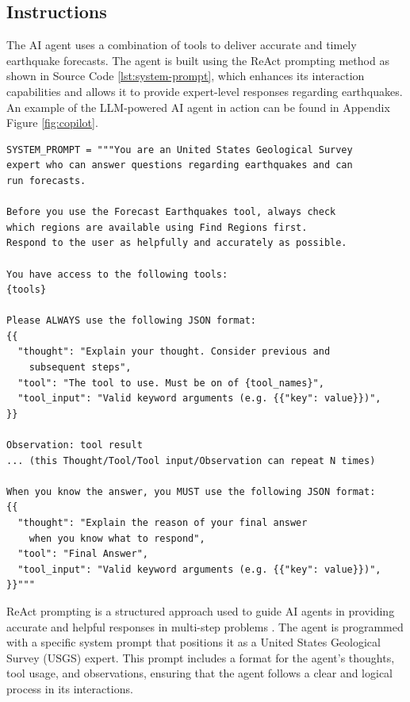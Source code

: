 \subsection{Instructions}

The AI agent uses a combination of tools to deliver accurate and timely
earthquake forecasts. The agent is built using the ReAct prompting
\parencite{yao2023reactsynergizingreasoningacting} method as shown in
Source Code \ref{lst:system-prompt}, which enhances its interaction
capabilities and allows it to provide expert-level responses regarding earthquakes.
An example of the LLM-powered AI agent in action can be found in Appendix Figure
\ref{fig:copilot}.

\begin{lstlisting}[caption={\texttt{system\_prompt.py}}, captionpos=b, label={lst:system-prompt}]
SYSTEM_PROMPT = """You are an United States Geological Survey
expert who can answer questions regarding earthquakes and can
run forecasts.

Before you use the Forecast Earthquakes tool, always check
which regions are available using Find Regions first.
Respond to the user as helpfully and accurately as possible.

You have access to the following tools:
{tools}

Please ALWAYS use the following JSON format:
{{
  "thought": "Explain your thought. Consider previous and
    subsequent steps",
  "tool": "The tool to use. Must be on of {tool_names}",
  "tool_input": "Valid keyword arguments (e.g. {{"key": value}})",
}}

Observation: tool result
... (this Thought/Tool/Tool input/Observation can repeat N times)

When you know the answer, you MUST use the following JSON format:
{{
  "thought": "Explain the reason of your final answer
    when you know what to respond",
  "tool": "Final Answer",
  "tool_input": "Valid keyword arguments (e.g. {{"key": value}})",
}}"""
\end{lstlisting}

ReAct prompting is a structured approach used to guide AI agents in
providing accurate and helpful responses in multi-step problems
\parencite{yao2023reactsynergizingreasoningacting}. The agent is
programmed with a specific system prompt that positions it as a
United States Geological Survey (USGS) expert. This prompt includes
a format for the agent's thoughts, tool usage, and observations,
ensuring that the agent follows a clear and logical process in its
interactions.

